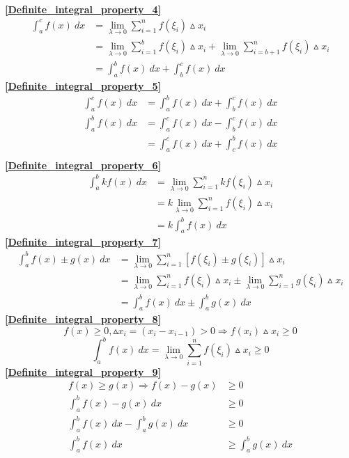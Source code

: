 \textbf{\large \ref{Definite_integral_property_4}}
\begin{align*}
	\int_{a}^{c}f(x)\ dx&=\lim\limits_{\lambda \to 0}\sum_{i=1}^{n}f(\xi_i)\vartriangle x_i\\
	&=\lim\limits_{\lambda \to 0}\sum_{i=1}^{b}f(\xi_i)\vartriangle x_i+\lim\limits_{\lambda \to 0}\sum_{i=b+1}^{n}f(\xi_i)\vartriangle x_i\\
	&=\int_{a}^{b} f(x)\ dx+\int_{b}^{c}f(x)\ dx
\end{align*}
\textbf{\large \ref{Definite_integral_property_5}}
\begin{align*}
	\int_{a}^{c}f(x)\ dx&=\int_{a}^{b} f(x)\ dx+\int_{b}^{c}f(x)\ dx\\ 
	\int_{a}^{b}f(x)\ dx&=\int_{a}^{c}f(x)\ dx-\int_{b}^{c}f(x)\ dx\\
	&=\int_{a}^{c}f(x)\ dx+\int_{c}^{b}f(x)\ dx\\
\end{align*}
\textbf{\large \ref{Definite_integral_property_6}}
\begin{align*}
	\int_{a}^{b}kf(x)\ dx&=\lim\limits_{\lambda \to 0}\sum_{i=1}^{n}kf(\xi_i)\vartriangle x_i\\
	&=k\lim\limits_{\lambda \to 0}\sum_{i=1}^{n}f(\xi_i)\vartriangle x_i\\
	&=k\int_{a}^{b}f(x)\ dx
\end{align*}
\textbf{\large \ref{Definite_integral_property_7}}
\begin{align*}
	\int_{a}^{b}f(x)\pm g(x)\ dx&=\lim\limits_{\lambda \to 0}\sum_{i=1}^{n}\left[f(\xi_i)\pm g(\xi_i)\right]\vartriangle x_i\\
	&=\lim\limits_{\lambda \to 0}\sum_{i=1}^{n}f(\xi_i)\vartriangle x_i\pm \lim\limits_{\lambda \to 0}\sum_{i=1}^{n}g(\xi_i)\vartriangle x_i\\
	&=\int_{a}^{b}f(x)\ dx\pm \int_{a}^{b}g(x)\ dx
\end{align*}
\textbf{\large \ref{Definite_integral_property_8}}
	$$f(x)\geqslant 0,\vartriangle x_i=(x_i-x_{i-1})>0\Rightarrow f(x_i)\vartriangle x_i\geqslant 0$$
	$$\int_{a}^{b} f(x)\ dx=\lim\limits_{\lambda \to 0}\sum_{i=1}^{n}f(\xi_i)\vartriangle x_i\geqslant 0 $$
\textbf{\large \ref{Definite_integral_property_9}}
\begin{align*}
	f(x)\geqslant g(x)\Rightarrow f(x)-g(x)&\geqslant 0\\
	\int_{a}^{b} f(x)-g(x)\ dx&\geqslant 0\\
	 \int_{a}^{b} f(x)\ dx-\int_{a}^{b}g(x)\ dx&\geqslant 0\\
	 \int_{a}^{b} f(x)\ dx&\geqslant \int_{a}^{b}g(x)\ dx
\end{align*}
